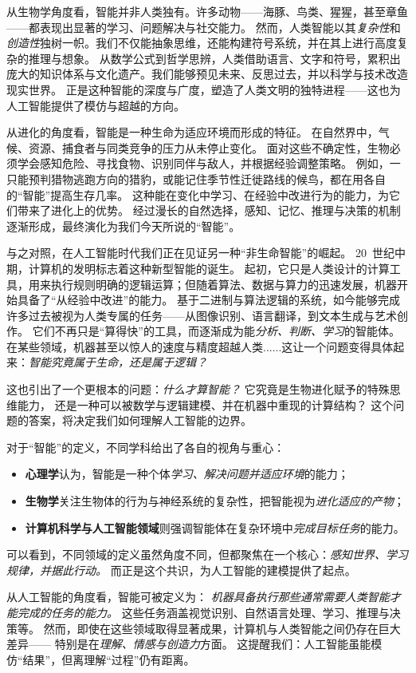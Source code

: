 从生物学角度看，智能并非人类独有。许多动物——海豚、鸟类、猩猩，甚至章鱼——都表现出显著的学习、问题解决与社交能力。
然而，人类智能以其\emph{复杂性}和\emph{创造性}独树一帜。我们不仅能抽象思维，还能构建符号系统，并在其上进行高度复杂的推理与想象。
从数学公式到哲学思辨，人类借助语言、文字和符号，累积出庞大的知识体系与文化遗产。我们能够预见未来、反思过去，并以科学与技术改造现实世界。
正是这种智能的深度与广度，塑造了人类文明的独特进程——这也为人工智能提供了模仿与超越的方向。

从进化的角度看，智能是一种生命为适应环境而形成的特征。
在自然界中，气候、资源、捕食者与同类竞争的压力从未停止变化。
面对这些不确定性，生物必须学会感知危险、寻找食物、识别同伴与敌人，并根据经验调整策略。
例如，一只能预判猎物逃跑方向的猎豹，或能记住季节性迁徙路线的候鸟，都在用各自的“智能”提高生存几率。
这种能在变化中学习、在经验中改进行为的能力，为它们带来了进化上的优势。
经过漫长的自然选择，感知、记忆、推理与决策的机制逐渐形成，最终演化为我们今天所说的“智能”。

与之对照，在人工智能时代我们正在见证另一种“非生命智能”的崛起。
20~世纪中期，计算机的发明标志着这种新型智能的诞生。
起初，它只是人类设计的计算工具，用来执行规则明确的逻辑运算；但随着算法、数据与算力的迅速发展，机器开始具备了“从经验中改进”的能力。
基于二进制与算法逻辑的系统，如今能够完成许多过去被视为人类专属的任务——从图像识别、语言翻译，到文本生成与艺术创作。
它们不再只是“算得快”的工具，而逐渐成为能\emph{分析、判断、学习}的智能体。
在某些领域，机器甚至以惊人的速度与精度超越人类......这让一个问题变得具体起来：\emph{智能究竟属于生命，还是属于逻辑？}

这也引出了一个更根本的问题：\emph{什么才算智能？}
它究竟是生物进化赋予的特殊思维能力，
还是一种可以被数学与逻辑建模、并在机器中重现的计算结构？
这个问题的答案，将决定我们如何理解人工智能的边界。

对于“智能”的定义，不同学科给出了各自的视角与重心：
\begin{itemize}
\item \textbf{心理学}认为，智能是一种个体\emph{学习、解决问题并适应环境}的能力；
\item \textbf{生物学}关注生物体的行为与神经系统的复杂性，把智能视为\emph{进化适应的产物}；
\item \textbf{计算机科学与人工智能领域}则强调智能体在复杂环境中\emph{完成目标任务}的能力。
\end{itemize}
可以看到，不同领域的定义虽然角度不同，但都聚焦在一个核心：\emph{感知世界、学习规律，并据此行动。}
而正是这个共识，为人工智能的建模提供了起点。

从人工智能的角度看，智能可被定义为：
\emph{机器具备执行那些通常需要人类智能才能完成的任务的能力。}
这些任务涵盖视觉识别、自然语言处理、学习、推理与决策等。
然而，即使在这些领域取得显著成果，计算机与人类智能之间仍存在巨大差异——
特别是在\emph{理解、情感与创造力}方面。
这提醒我们：人工智能虽能模仿“结果”，但离理解“过程”仍有距离。


